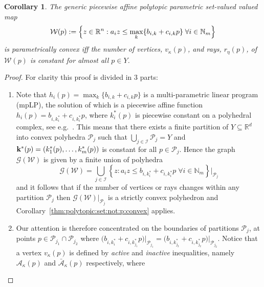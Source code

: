 \documentclass[a4paper, 12pt, twoside]{article}
\newtheorem{cor}[thm]{Corollary}
\theoremstyle{definition}
\numberwithin{equation}{section}
\begin{document}
%
\begin{cor}\label{thm:p:convexity:PWA:set:constant:num:verts}
The generic piecewise affine polytopic parametric set-valued valued map 
%
\begin{equation}\label{eq:definition:PWA:polytopic:set:general}
  \mathcal W(p) := \Bigl\{z\in\mathbb R^n: a_i z \leq \max_{k}\{b_{i,k} + c_{i,k}p\} \; \forall i\in\mathbb N_m \Bigr\}
\end{equation}
%
is parametrically convex iff the number of vertices, $v_\kappa(p)$, and rays, $r_\eta(p)$, of~$\mathcal W(p)$ is constant for almost all $p\in Y$.
\end{cor}
%
\begin{proof}
For clarity this proof is divided in 3 parts:
\begin{enumerate}
\item Note that $h_i(p) = \max_{k} \{b_{i,k} + c_{i,k}p\}$ is a multi-parametric linear program (mpLP),
the solution of which is a piecewise affine function $h_i(p) = b_{i,k^\ast_i} + c_{i,k^\ast_i}p$, where $k^\ast_i(p)$ is piecewise constant on a polyhedral complex, see e.g.~\cite{spjotvold:2005}.
%
This means that there exists a finite partition of $Y\subseteq\mathbb R^d$ into convex polyhedra 
$\mathcal P_j$ such that $\bigcup_{j\in\mathcal I} \mathcal P_j = Y$ and 
${\bf{k}}^\ast(p) = (k_1^\ast(p),\dots,k_m^\ast(p))$ is constant for all $p \in \mathcal P_j$.
%
Hence the graph $\mathscr G(\mathcal W)$ is given by a finite union of polyhedra
%
\begin{equation*}
  \mathscr G(\mathcal W) = \bigcup_{j\in\mathcal I} \left\{z: a_i z \leq b_{i,k_i^\ast} + c_{i,k_i^\ast}p \; \forall i \in\mathbb N_m \right\}\bigr\vert_{\mathcal P_{j}}
\end{equation*}
%
and it follows that if the number of vertices or rays changes within any partition $\mathcal P_j$ then $\mathscr
G(\mathcal W)\vert_{\mathcal P_j}$ is a strictly convex polyhedron and Corollary~\ref{thm:polytopic:set:not:p:convex} applies.
%
\item Our attention is therefore concentrated on the boundaries of partitions $\mathcal P_j$, at points $p\in\mathcal P_{j_1} \cap \mathcal P_{j_2}$ where 
$\bigl(b_{i,k_i^\ast} + c_{i,k_{j_1}^\ast} p\bigr)\bigr\rvert_{\mathcal P_{j_1}} = 
\bigl(b_{i,k_{j_2}^\ast} + c_{i,k_{j_2}^\ast} p\bigr)\bigr\rvert_{\mathcal P_{j_2}}$.
%
Notice that a vertex $v_\kappa(p)$ is defined by \emph{active} and \emph{inactive} inequalities, namely $\mathcal A_\kappa(p)$ and
$\bar{\mathcal A}_\kappa(p)$ respectively, where

\end{enumerate}
\end{proof}
\end{document}

